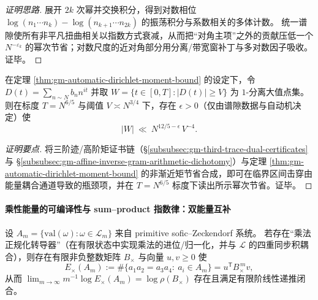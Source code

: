 \begin{proof}[证明思路]
展开 \(2k\) 次幂并交换积分，得到对数相位 \(\log(n_1\cdots n_k)-\log(n_{k+1}\cdots n_{2k})\) 的振荡积分与系数相关的多体计数。
统一谱隙使所有非平凡扭曲相关以指数方式衰减，从而把“对角主项”之外的贡献压低一个 \(N^{-\varepsilon_k}\) 的幂次节省；对数尺度的近对角部分用分离/带宽窗补丁与多对数因子吸收。证毕。
\end{proof}

\begin{corollary}\label{cor:gm-critical-window-automatic-saving}
在定理 \ref{thm:gm-automatic-dirichlet-moment-bound} 的设定下，令
\(
D(t)=\sum_{n\sim N} b_n n^{it}
\)
并取 \(W=\{t\in[0,T]:|D(t)|\ge V\}\) 为 \(1\)-分离大值点集。
则在标度 \(T=N^{6/5}\) 与阈值 \(V\asymp N^{3/4}\) 下，存在 \(\epsilon>0\)（仅由谱隙数据与自动机决定）使
\[
|W|\ \ll\ N^{12/5-\epsilon}\,V^{-4}.
\]
\end{corollary}

\begin{proof}[证明要点]
将三阶迹/高阶矩证书链（\S\ref{subsubsec:gm-third-trace-dual-certificates} 与 \S\ref{subsubsec:gm-affine-inverse-gram-arithmetic-dichotomy}）与定理 \ref{thm:gm-automatic-dirichlet-moment-bound} 的非渐近矩节省合成，即可在临界区间击穿由能量耦合通道导致的瓶颈项，并在 \(T=N^{6/5}\) 标度下读出所示幂次节省。证毕。
\end{proof}

\paragraph{乘性能量的可编译性与 sum--product 指数律：双能量互补}
\begin{theorem}\label{thm:gm-multiplicative-energy-compilable}
设 \(A_m=\{\mathrm{val}(\omega):\omega\in\mathcal{L}_m\}\) 来自 primitive sofic--Zeckendorf 系统。
若存在“乘法正规化转导器”（在有限状态中实现乘法的进位/归一化，并与 \(\mathcal{L}\) 的四重同步积耦合），则存在有限非负整数矩阵 \(B_{\times}\) 与向量 \(u,v\ge 0\) 使
\[
E_{\times}(A_m):=\#\{a_1a_2=a_3a_4:\ a_i\in A_m\}
=u^{\mathsf T}B_{\times}^{\,m}v,
\]
从而 \(\lim_{m\to\infty}m^{-1}\log E_\times(A_m)=\log\rho(B_\times)\) 存在且满足有限阶线性递推闭合。
\end{theorem}

